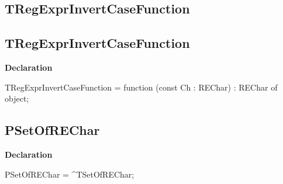 \documentclass{report}
\newif\ifpdf
\begin{document}
\subsection*{\large{\textbf{TRegExprInvertCaseFunction}}\normalsize\hspace{1ex}\hrulefill}
\else
\subsection*{TRegExprInvertCaseFunction}
\fi
\label{RegExpr-TRegExprInvertCaseFunction}
\begin{list}{}{
\setlength{\itemindent}{0cm}
\setlength{\listparindent}{0cm}
\setlength{\leftmargin}{\evensidemargin}
\addtolength{\leftmargin}{\tmplength}
\settowidth{\labelsep}{X}
\addtolength{\leftmargin}{\labelsep}
\setlength{\labelwidth}{\tmplength}
}
\item[\textbf{Declaration}\hfill]
\ifpdf
\begin{flushleft}
\fi
\begin{ttfamily}
TRegExprInvertCaseFunction = function (const Ch : REChar) : REChar of object;\end{ttfamily}

\ifpdf
\end{flushleft}
\fi

\end{list}
\ifpdf
\subsection*{\large{\textbf{PSetOfREChar}}\normalsize\hspace{1ex}\hrulefill}
\else
\subsection*{PSetOfREChar}
\fi
\label{RegExpr-PSetOfREChar}
\begin{list}{}{
\setlength{\itemindent}{0cm}
\setlength{\listparindent}{0cm}
\setlength{\leftmargin}{\evensidemargin}
\addtolength{\leftmargin}{\tmplength}
\settowidth{\labelsep}{X}
\addtolength{\leftmargin}{\labelsep}
\setlength{\labelwidth}{\tmplength}
}
\item[\textbf{Declaration}\hfill]
\ifpdf
\begin{flushleft}
\fi
\begin{ttfamily}
PSetOfREChar = {\^{}}TSetOfREChar;\end{ttfamily}

\ifpdf
\end{flushleft}
\fi

\end{list}
\ifpdf
\end{document}
